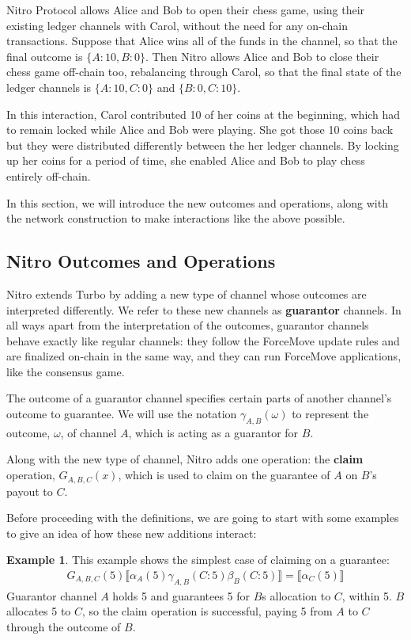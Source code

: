 \documentclass{article}
\theoremstyle{definition}
\newtheorem{example}{Example}[section]
\newcommand{\adj}[1]{\llbracket #1 \rrbracket}
\begin{document}
Nitro Protocol allows Alice and Bob to open their chess game, using their existing ledger channels with Carol, without the need for any on-chain transactions.
Suppose that Alice wins all of the funds in the channel, so that the final outcome is $\{A: 10, B: 0\}$.
Then Nitro allows Alice and Bob to close their chess game off-chain too, rebalancing through Carol, so that the final state of the ledger channels is $\{A: 10, C: 0\}$ and $\{B: 0, C: 10\}$.

In this interaction, Carol contributed 10 of her coins at the beginning, which had to remain locked while Alice and Bob were playing.
She got those 10 coins back but they were distributed differently between the her ledger channels.
By locking up her coins for a period of time, she enabled Alice and Bob to play chess entirely off-chain.

In this section, we will introduce the new outcomes and operations, along with the network construction to make interactions like the above possible.

\subsection{Nitro Outcomes and Operations}

Nitro extends Turbo by adding a new type of channel whose outcomes are interpreted differently.
We refer to these new channels as \textbf{guarantor} channels.
In all ways apart from the interpretation of the outcomes, guarantor channels behave exactly like regular channels: they follow the ForceMove update rules and are finalized on-chain in the same way, and they can run ForceMove applications, like the consensus game.

The outcome of a guarantor channel specifies certain parts of another channel's outcome to guarantee.
We will use the notation $\gamma_{A, B}(\omega)$ to represent the outcome, $\omega$, of channel $A$, which is acting as a guarantor for $B$.

Along with the new type of channel, Nitro adds one operation: the \textbf{claim} operation, $G_{A, B, C}(x)$, which is used to claim on the guarantee of $A$ on $B$'s payout to $C$.

Before proceeding with the definitions, we are going to start with some examples to give an idea of how these new additions interact:

\begin{example}
  This example shows the simplest case of claiming on a guarantee:
  \begin{align*}
    G_{A, B, C}(5)\adj{\alpha_A(5)\gamma_{A, B}(C: 5)\beta_B(C:5)} = \adj{\alpha_C(5)}
  \end{align*}
  Guarantor channel $A$ holds 5 and guarantees 5 for $B$s allocation to $C$, within 5.
  $B$ allocates 5 to $C$, so the claim operation is successful, paying 5 from $A$ to $C$ through the outcome of $B$.
\end{example}
\end{document}
